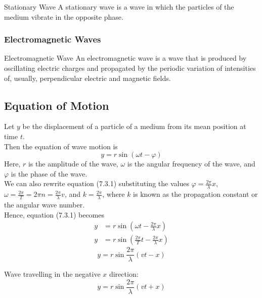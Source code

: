 \documentclass[12pt]{article}
\numberwithin{equation}{subsection}
\begin{document}
\begin{definition}{Stationary Wave}{}
    A stationary wave is a wave in which the particles of the medium vibrate in the opposite phase.
\end{definition}

\subsubsection{Electromagnetic Waves}

\begin{definition}{Electromagnetic Wave}{}
    An electromagnetic wave is a wave that is produced by oscillating electric charges and propagated by the periodic variation of intensities of, usually, perpendicular electric and magnetic fields.
\end{definition}

\subsection{Equation of Motion}
Let $y$ be the displacement of a particle of a medium from its mean position at time $t$. \\

Then the equation of wave motion is
\begin{equation}
    \boxed{ y = r \sin{(\omega t - \varphi)} }
\end{equation}
Here, $r$ is the amplitude of the wave, $\omega$ is the angular frequency of the wave, and $\varphi$ is the phase of the wave. \\
We can also rewrite equation (7.3.1) substituting the values $\displaystyle \varphi = \frac{2\pi}{\lambda}x$, $\displaystyle \omega = \frac{2\pi}{T} = 2\pi n = \frac{2\pi}{\lambda} v$, and $\displaystyle k = \frac{2\pi}{\lambda}$, where $k$ is known as the propagation constant or the angular wave number. \\
Hence, equation (7.3.1) becomes
\begin{align*}
    y &= r \sin{\left( \omega t - \frac{2\pi}{\lambda}x \right)} \\
    y &= r \sin{\left( \frac{2\pi}{T}t - \frac{2\pi}{\lambda}x \right)}
\end{align*}
\begin{equation}
    \boxed{ y = r \sin{\frac{2\pi}{\lambda} \left( vt - x \right)} }
\end{equation}

Wave travelling in the negative $x$ direction:
\begin{equation}
    \boxed{ y = r \sin{\frac{2\pi}{\lambda} \left( vt + x \right)} }
\end{equation}
\end{document}
